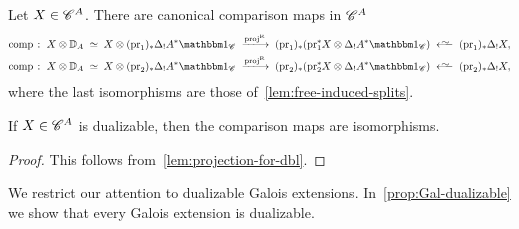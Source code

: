 \documentclass[english,svgnames,table]{article}
\begin{document}
    \begin{construction}
    \label{cons:comparison-map}
        Let $X\in \mathscr{C}^A$. There are canonical comparison maps in $\mathscr{C}^A$
        \begin{equation*}
            \begin{split}
                & \comp \;\colon\; X \otimes \DD_A \;\simeq\; X \otimes (\pr_1)_* \Delta_! A^* \ounit_{\cC} 
                \;\xtoo{\Rproj}\; (\pr_1)_* (\pr_1^* X \otimes \Delta_! A^* \ounit_{\cC})
                \;\isogetss\; (\pr_1)_* \Delta_! X, \\
                & \comp \;\colon\; X \otimes \DD_A \;\simeq\; X \otimes (\pr_2)_* \Delta_! A^* \ounit_{\cC} 
                \;\xtoo{\Rproj}\; (\pr_2)_* (\pr_2^* X \otimes \Delta_! A^* \ounit_{\cC})
                \;\isogetss\; (\pr_2)_* \Delta_! X,
            \end{split}
        \end{equation*}
        where the last isomorphisms are those of~\cref{lem:free-induced-splits}.
    \end{construction}

    \begin{corollary}
    \label{cor:X[G]_hG=X@D}
        If $X\in \mathscr{C}^A$ is dualizable, then the comparison maps are isomorphisms.
    \end{corollary}
    \begin{proof}
        This follows from~\cref{lem:projection-for-dbl}.
    \end{proof}

    We restrict our attention to dualizable Galois extensions. In~\cref{prop:Gal-dualizable} we show that every Galois extension is dualizable.
\end{document}
